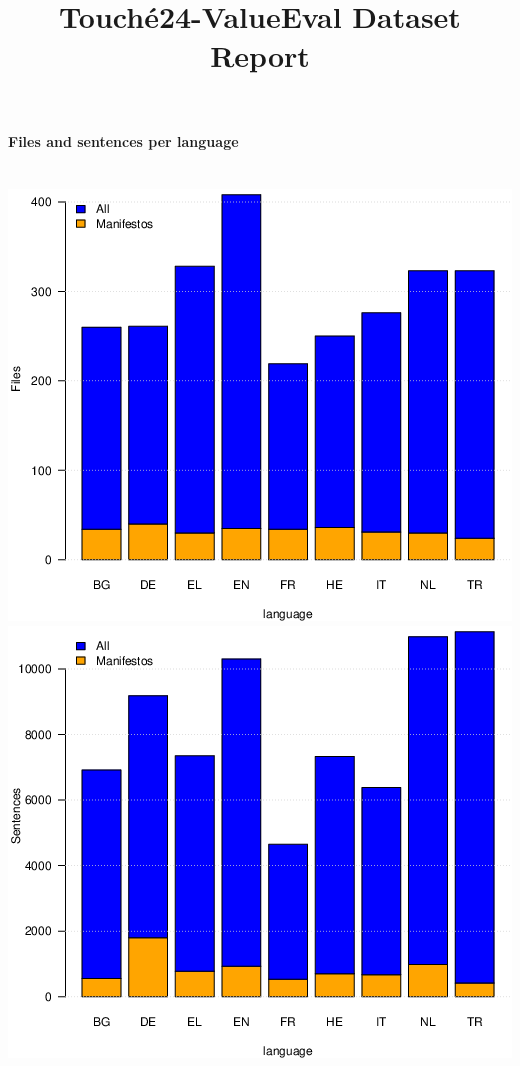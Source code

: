 \documentclass[a4paper]{article}
\title{Touch{\'e}24-ValueEval Dataset Report}
\begin{document}
\maketitle

\paragraph{Files and sentences per language}\noindent\\[\baselineskip]
\includegraphics[width=.49\linewidth]{files-per-language}%
\hfill%
\includegraphics[width=.49\linewidth]{sentences-per-language}
\end{document}
